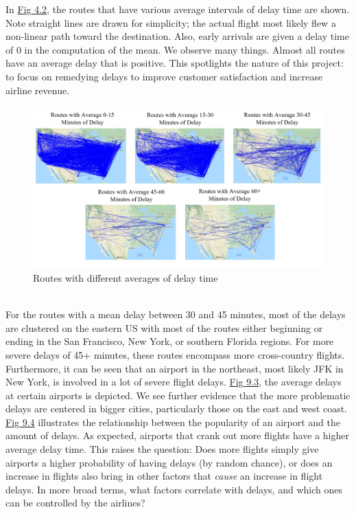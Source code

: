 \documentclass[12pt, a4paper, openany]{book}
\newcommand\tab[1][1cm]{\hspace*{#1}}
\begin{document}
			\tab In \underline{Fig 4.2}, the routes that have various average intervals of delay time are shown. Note straight lines are drawn for simplicity; the actual flight most likely flew a non-linear path toward the destination. Also, early arrivals are given a delay time of 0 in the computation of the mean. We observe many things. Almost all routes have an average delay that is positive. This spotlights the nature of this project: to focus on remedying delays to improve customer satisfaction and increase airline revenue.
			\begin{figure}[h]
			\centering
	 		\includegraphics[width = .9 \textwidth]{../figures/PLOTS FOR REPORT/Chapter 4/Figure 4.21}
	 		\caption{Routes with different averages of delay time}
	 		\end{figure}\\

	 		\tab For the routes with a mean delay between 30 and 45 minutes, most of the delays are clustered on the eastern US with most of the routes either beginning or ending in the San Francisco, New York, or southern Florida regions. For more severe delays of 45+ minutes, these routes encompass more cross-country flights. Furthermore, it can be seen that an airport in the northeast, most likely JFK in New York, is involved in a lot of severe flight delays. \underline{Fig 9.3}, the average delays at certain airports is depicted. We see further evidence that the more problematic delays are centered in bigger cities, particularly those on the east and west coast. \underline{Fig 9.4} illustrates the relationship between the popularity of an airport and the amount of delays. As expected, airports that crank out more flights have a higher average delay time. This raises the question: Does more flights simply give airports a higher probability of having delays (by random chance), or does an increase in flights also bring in other factors that \textit{cause} an increase in flight delays. In more broad terms, what factors correlate with delays, and which ones can be controlled by the airlines?\\
\end{document}
